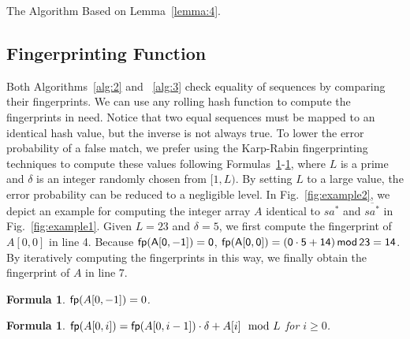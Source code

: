 \documentclass[10pt,journal,compsoc]{IEEEtran}
\newtheorem{formula}[theorem]{Formula}
\begin{document}
\begin{algorithm*}

	\caption{The Algorithm Based on Lemma~\ref{lemma:4}.}
	
	\label{alg:3}
	
\end{algorithm*}


\subsection{Fingerprinting Function}

Both Algorithms~\ref{alg:2} and ~\ref{alg:3} check equality of sequences by comparing their fingerprints. We can use any rolling hash function to compute the fingerprints in need. Notice that two equal sequences must be mapped to an identical hash value, but the inverse is not always true. To lower the error probability of a false match, we prefer using the Karp-Rabin fingerprinting techniques to compute these values following Formulas~\ref{formula:1}-\ref{formula:2}, where $L$ is a prime and $\delta$ is an integer randomly chosen from $[1, L)$. By setting $L$ to a large value, the error probability can be reduced to a negligible level. In Fig.~\ref{fig:example2}, we depict an example for computing the integer array $A$ identical to $sa^*$ and $\overline{sa^*}$ in Fig.~\ref{fig:example1}. Given $L = 23$ and $\delta = 5$, we first compute the fingerprint of $A[0, 0]$ in line 4. Because $\sf fp(A[0, -1]) = 0$, $\sf fp(A[0, 0]) = (0 \cdot 5 + 14) \, mod \, 23 = 14$.  By iteratively computing the fingerprints in this way, we finally obtain the fingerprint of $A$ in line 7.

\begin{formula} \label{formula:1}${\sf fp}(A[0, -1]) = 0$.
\end{formula}

\begin{formula} \label{formula:2}${\sf fp}(A[0, i]) = {\sf fp}(A[0, i - 1]) \cdot {\delta} + A[i]\mod L$ for $i \ge 0$.
\end{formula}
\end{document}
